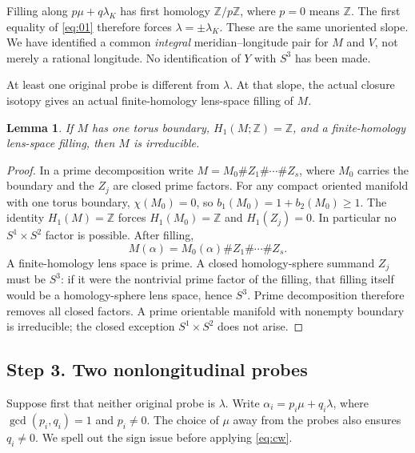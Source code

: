\documentclass[11pt]{amsart}
\newtheorem{lemma}[theorem]{Lemma}
\theoremstyle{definition}
\theoremstyle{remark}
\newcommand{\Z}{\mathbb Z}
\begin{document}
Filling along \(p\mu+q\lambda_K\) has first homology
\(\Z/p\Z\), where \(p=0\) means \(\Z\).
The first equality of \eqref{eq:01} therefore forces
\(\lambda=\pm\lambda_K\). These are the same
unoriented slope. We have identified a common
\emph{integral} meridian--longitude pair for \(M\)
and \(V\), not merely a rational longitude.
No identification of \(Y\) with \(S^3\) has been made.

At least one original probe is different from
\(\lambda\). At that slope, the actual closure
isotopy gives an actual finite-homology lens-space
filling of \(M\).

\begin{lemma}\label{lem:irreducible}
If \(M\) has one torus boundary, \(H_1(M;\Z)=\Z\),
and a finite-homology lens-space filling, then \(M\)
is irreducible.
\end{lemma}
\begin{proof}
In a prime decomposition write \(M=M_0\# Z_1\#\cdots\#Z_s\),
where \(M_0\) carries the boundary and the \(Z_j\) are
closed prime factors. For any compact oriented
manifold with one torus boundary,
\(\chi(M_0)=0\), so \(b_1(M_0)=1+b_2(M_0)\ge1\).
The identity \(H_1(M)=\Z\) forces
\(H_1(M_0)=\Z\) and \(H_1(Z_j)=0\).
In particular no \(S^1\times S^2\) factor is possible.
After filling,
\[
 M(\alpha)=M_0(\alpha)\#Z_1\#\cdots\#Z_s.
 \]
A finite-homology lens space is prime. A closed
homology-sphere summand \(Z_j\) must be \(S^3\):
if it were the nontrivial prime factor of the
filling, that filling itself would be a
homology-sphere lens space, hence \(S^3\).
Prime decomposition therefore removes all closed
factors. A prime orientable manifold with nonempty
boundary is irreducible; the closed exception
\(S^1\times S^2\) does not arise.
\end{proof}

\subsection*{Step 3. Two nonlongitudinal probes}

Suppose first that neither original probe is
\(\lambda\). Write
\(\alpha_i=p_i\mu+q_i\lambda\), where
\(\gcd(p_i,q_i)=1\) and \(p_i\ne0\). The choice of
\(\mu\) away from the probes also ensures \(q_i\ne0\).
We spell out the sign issue before applying
\eqref{eq:cw}.
\end{document}
